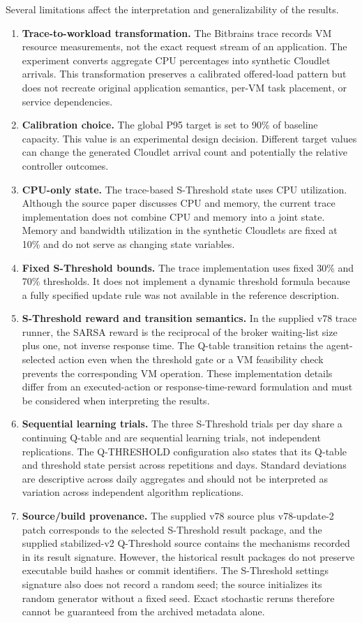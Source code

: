 \documentclass[pdflatex,sn-mathphys-num]{sn-jnl}
\begin{document}
Several limitations affect the interpretation and generalizability of the results.
\begin{enumerate}[leftmargin=1.8em]
  \item \textbf{Trace-to-workload transformation.} The Bitbrains trace records VM resource measurements, not the exact request stream of an application. The experiment converts aggregate CPU percentages into synthetic Cloudlet arrivals. This transformation preserves a calibrated offered-load pattern but does not recreate original application semantics, per-VM task placement, or service dependencies.
  \item \textbf{Calibration choice.} The global P95 target is set to 90\% of baseline capacity. This value is an experimental design decision. Different target values can change the generated Cloudlet arrival count and potentially the relative controller outcomes.
  \item \textbf{CPU-only state.} The trace-based S-Threshold state uses CPU utilization. Although the source paper discusses CPU and memory, the current trace implementation does not combine CPU and memory into a joint state. Memory and bandwidth utilization in the synthetic Cloudlets are fixed at 10\% and do not serve as changing state variables.
  \item \textbf{Fixed S-Threshold bounds.} The trace implementation uses fixed 30\% and 70\% thresholds. It does not implement a dynamic threshold formula because a fully specified update rule was not available in the reference description.
  \item \textbf{S-Threshold reward and transition semantics.} In the supplied v78 trace runner, the SARSA reward is the reciprocal of the broker waiting-list size plus one, not inverse response time. The Q-table transition retains the agent-selected action even when the threshold gate or a VM feasibility check prevents the corresponding VM operation. These implementation details differ from an executed-action or response-time-reward formulation and must be considered when interpreting the results.
  \item \textbf{Sequential learning trials.} The three S-Threshold trials per day share a continuing Q-table and are sequential learning trials, not independent replications. The Q-THRESHOLD configuration also states that its Q-table and threshold state persist across repetitions and days. Standard deviations are descriptive across daily aggregates and should not be interpreted as variation across independent algorithm replications.
  \item \textbf{Source/build provenance.} The supplied v78 source plus v78-update-2 patch corresponds to the selected S-Threshold result package, and the supplied stabilized-v2 Q-Threshold source contains the mechanisms recorded in its result signature. However, the historical result packages do not preserve executable build hashes or commit identifiers. The S-Threshold settings signature also does not record a random seed; the source initializes its random generator without a fixed seed. Exact stochastic reruns therefore cannot be guaranteed from the archived metadata alone.

\end{enumerate}
\end{document}
